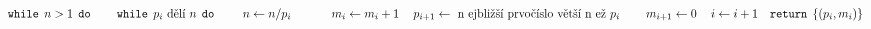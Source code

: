 \documentclass[preview]{standalone}
\begin{document}
\begin{align*}
& \mathtt{while}  \:\:  n  > 1 \:\:  \mathtt{do} &\hspace*{12pt} \mathtt{while}  \:\:  p_i  \text{ dělí }  n  \:\:  \mathtt{do} &\hspace*{24pt} n  \leftarrow  n  /  p_i &\hspace*{24pt} m_i  \leftarrow  m_i  + 1 &\hspace*{12pt}p_{i+1} \leftarrow \text{  n ejbližší prvočíslo větší  n ež }  p_i &\hspace*{12pt}m_{i+1} \leftarrow 0 &\hspace*{12pt}i \leftarrow i + 1 & \mathtt{return}  \:\: \{( p_i ,  m_i )\}
\end{align*}
\end{document}
